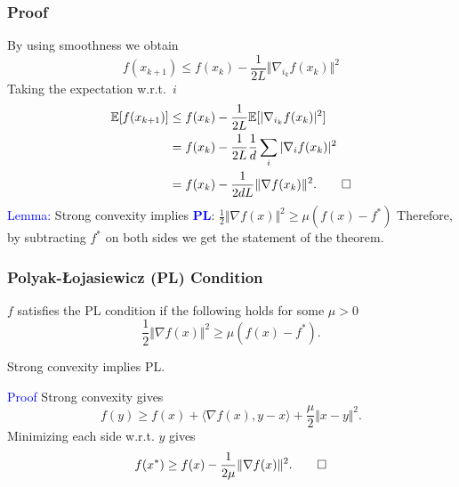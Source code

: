 \documentclass[aspectratio=149]{beamer}
\begin{document}
\begin{frame}
  \frametitle{Proof}
  By using smoothness we obtain
  \begin{equation}
    f(x_{k+1}) \le f(x_k) - \frac{1}{2L} \Vert \nabla_{i_k} f(x_k) \Vert^2
  \end{equation}
  Taking the expectation w.r.t.\ $i$
  \begin{equation}
    \begin{aligned}
      \mathbb{E} [f(x_{k+1})] &\le f(x_k) - \frac{1}{2L} \mathbb{E}[\vert \nabla_{i_k} f(x_k) \vert^2] \\
      &= f(x_k) - \frac{1}{2L}\frac{1}{d} \sum_{i} \vert \nabla_i f(x_k) \vert^2 \\
      &= f(x_k) - \frac{1}{2 d L} \Vert \nabla f(x_k) \Vert^2.\qed
    \end{aligned}
  \end{equation}
  \textcolor{blue}{Lemma:} Strong convexity implies \textcolor{blue}{\textbf{PL}}: $\frac12 \Vert \nabla f(x) \Vert^2 \ge \mu (f(x)-f^*)$
  Therefore, by subtracting $f^*$ on both sides we get the statement of the theorem.
\end{frame}

\begin{frame}
  \frametitle{Polyak-{\L}ojasiewicz (PL) Condition}
  \begin{definition}
    $f$ satisfies the PL condition if the following holds for some $\mu>0$
    \begin{equation}
      \frac12 \Vert \nabla f(x) \Vert^2 \ge \mu (f(x)-f^*).
    \end{equation}
  \end{definition}

  \begin{lemma}%
    Strong convexity implies PL.
  \end{lemma}
  \textcolor{blue}{Proof}
    Strong convexity gives
    \begin{equation}
      f(y) \ge f(x) + \langle \nabla f(x), y-x \rangle + \frac{\mu}{2} \Vert x-y \Vert^2.
    \end{equation}
    Minimizing each side w.r.t. $y$ gives
    \begin{equation}
      f(x^*) \ge f(x) - \frac{1}{2 \mu} \Vert \nabla f(x) \Vert^2. \qed
    \end{equation}
\end{frame}
\end{document}
